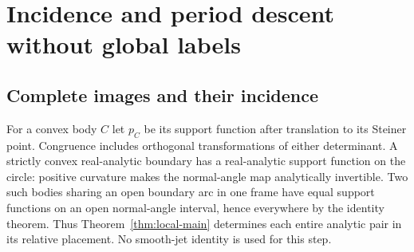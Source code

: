\section{Incidence and period descent without global labels}\label{sec:descent}
\subsection{Complete images and their incidence}
For a convex body $C$ let $p_C$ be its support function after translation
to its Steiner point. Congruence includes orthogonal transformations of
either determinant. A strictly convex real-analytic boundary has a
real-analytic support function on the circle: positive curvature makes
the normal-angle map analytically invertible. Two such bodies sharing
an open boundary arc in one frame have equal support functions on an
open normal-angle interval, hence everywhere by the identity theorem.
Thus Theorem~\ref{thm:local-main} determines each entire analytic pair
in its relative placement. No smooth-jet identity is used for this step.

